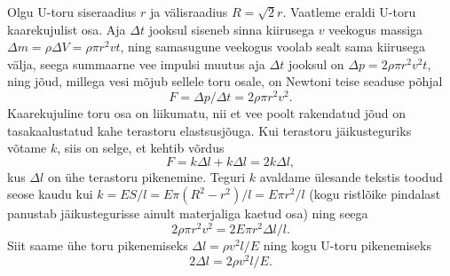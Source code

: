 \solu
Olgu U-toru siseraadius $r$ ja välisraadius $R = \sqrt 2 r$. Vaatleme eraldi U-toru kaarekujulist osa. Aja $\Delta t$ jooksul siseneb sinna kiirusega $v$ veekogus massiga $\Delta m = \rho \Delta V = \rho \pi r^2vt$, ning samasugune veekogus voolab sealt sama kiirusega välja, seega summaarne vee impulsi muutus aja $\Delta t$ jooksul on $\Delta p= 2\rho\pi r^2v^2 t$, ning jõud, millega vesi mõjub sellele toru osale, on Newtoni teise seaduse põhjal
\[
F=\Delta p/\Delta t= 2\rho\pi r^2v^2. 
\]
Kaarekujuline toru osa on liikumatu, nii et vee poolt rakendatud jõud on tasakaalustatud kahe terastoru elastsusjõuga. Kui terastoru jäikusteguriks võtame $k$, siis on selge, et kehtib võrdus
\[
F = k\Delta l+k\Delta l = 2k\Delta l,
\] 
kus $\Delta l$ on ühe terastoru pikenemine. Teguri $k$ avaldame ülesande tekstis toodud seose kaudu kui $k = ES/l = E\pi \left(R^2 - r^2\right)/l = E\pi r^2/l$ (kogu ristlõike pindalast panustab jäikustegurisse ainult materjaliga kaetud osa) ning seega 
\[
2\rho\pi r^2 v^2= 2E\pi r^2\Delta l/l.
\]
Siit saame ühe toru pikenemiseks $\Delta l=\rho v^2 l/E$ ning kogu U-toru pikenemiseks 
\[
2\Delta l= 2\rho v^2 l/E.
\]
\probend